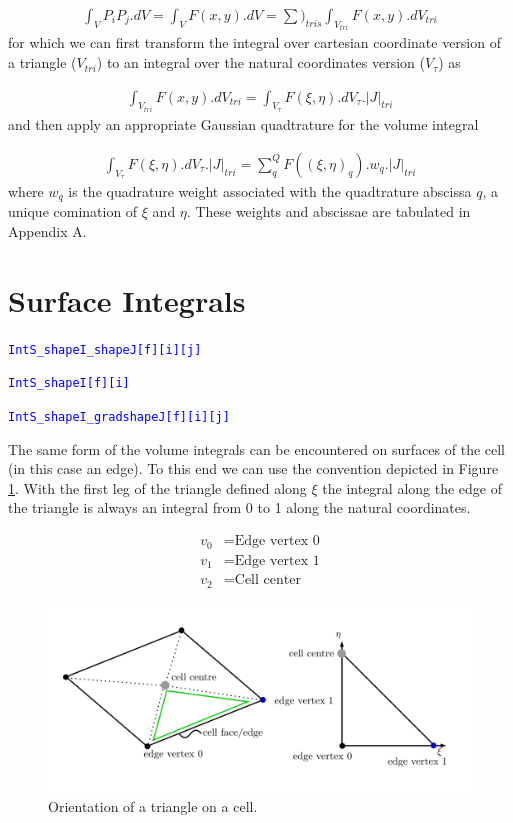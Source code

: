 \documentclass[11pt,letterpaper,titlepage]{article}
\newcommand{\beq}{\begin{equation*}
\begin{aligned}}
\newcommand{\eeq}{\end{aligned}
\end{equation*}}
\newcommand{\beqn}{\begin{equation}
	\begin{aligned}}
\newcommand{\eeqn}{\end{aligned}
	\end{equation}}
\newcommand{\xmltag}[1]{\textcolor{blue}{ \texttt{#1}} }
\begin{document}
\beqn 
\int_V P_i P_j .dV = \int_V F(x,y).dV 
= \sum)_{tris} \int_{V_{tri}} F(x,y).dV_{tri}
\eeqn 
\newline
for which we can first transform the integral over cartesian coordinate version of a triangle ($V_{tri}$) to an integral over the natural coordinates version ($V_\tau$) as

\beqn 
\int_{V_{tri}} F(x,y).dV_{tri} = \int_{V_{\tau}} F(\xi,\eta).dV_\tau.|J|_{tri}
\eeqn 
\newline
and then apply an appropriate Gaussian quadtrature for the volume integral

\beqn 
\int_{V_{\tau}} F(\xi,\eta).dV_\tau.|J|_{tri} = 
\sum_q^Q F((\xi,\eta)_q).w_q.|J|_{tri}
\eeqn 
\newline
where $w_q$ is the quadrature weight associated with the quadtrature abscissa $q$, a unique comination of $\xi$ and $\eta$. These weights and abscissae are tabulated in Appendix A.




\vspace{0.5cm}
\section{Surface Integrals}
\xmltag{IntS\_shapeI\_shapeJ[f][i][j]}

\xmltag{IntS\_shapeI[f][i]}

\xmltag{IntS\_shapeI\_gradshapeJ[f][i][j]}

\vspace{0.5cm}
The same form of the volume integrals can be encountered on surfaces of the cell (in this case an edge). To this end we can use the convention depicted in Figure \ref{fig:twodedgetriangle}. With the first leg of the triangle defined along $\xi$ the integral along the edge of the triangle is always an integral from 0 to 1 along the natural coordinates.

\beq 
v_0 &= \text{Edge vertex 0}\\
v_1 &= \text{Edge vertex 1}\\
v_2 &= \text{Cell center}
\eeq 

\begin{figure}[H]
\centering
\includegraphics[width=0.9\linewidth]{Figures/TwoD_EdgeTriangle}
\caption{Orientation of a triangle on a cell.}
\label{fig:twodedgetriangle}
\end{figure}
\end{document}
